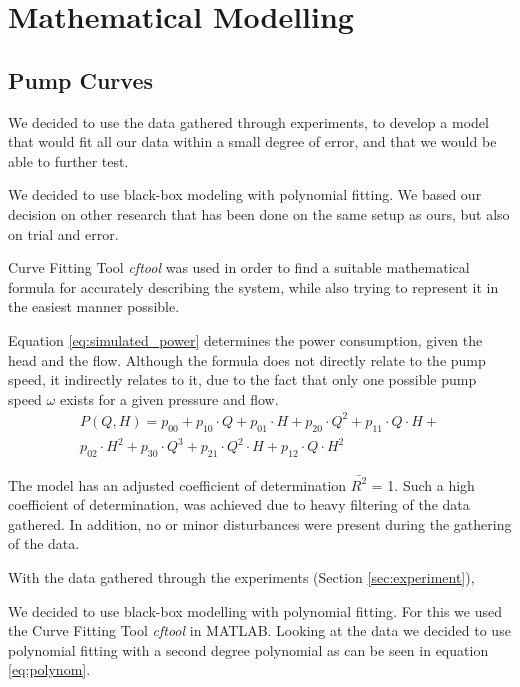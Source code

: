 \chapter{Mathematical Modelling}\label{ch:mathmodel}

\section{Pump Curves}\label{sec:pumpcurves}


We decided to use the data gathered through experiments, to develop a model that would fit all our data within a small degree of error, 
and that we would be able to further test.

We decided to use black-box modeling with polynomial fitting. We based our decision on other research that has been done on the same
setup as ours, but also on trial and error.

Curve Fitting Tool \cite{cftool} \textit{cftool} was used in order to find a suitable mathematical formula for accurately describing the 
system, while also trying to represent it in the easiest manner possible. 

Equation \ref{eq:simulated_power} determines the power consumption, given the head and the flow. Although the formula does not directly
relate to the pump speed, it indirectly relates to it, due to the fact that only one possible pump speed $\omega$ exists for a given
pressure and flow.
\begin{multline}
		P(Q,H) = p_{00} + p_{10} \cdot Q + p_{01} \cdot H + p_{20} \cdot Q^2 + p_{11} \cdot Q \cdot H + \\
		p_{02} \cdot H^2 + p_{30} \cdot Q ^ 3 + p_{21} \cdot Q^2 \cdot H + p_{12} \cdot Q \cdot H^2
		\label{eq:simulated_power}
\end{multline}

The model has an adjusted coefficient of determination  $\bar{R^2}$ = 1. Such a high coefficient of determination, was achieved due to
heavy filtering of the data gathered. In addition, no or minor disturbances were present during the gathering of the data.


\newpage
With the data gathered through the experiments (Section \ref{sec:experiment}),

We decided to use black-box modelling with polynomial fitting.
For this we used the Curve Fitting Tool \cite{cftool} \textit{cftool} 
 in MATLAB.
Looking at the data we decided to use polynomial fitting with a second degree polynomial
as can be seen in equation \ref{eq:polynom}.

